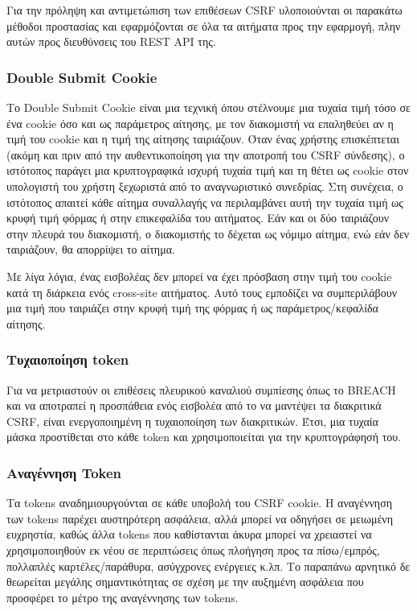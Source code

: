 Για την πρόληψη και αντιμετώπιση των επιθέσεων CSRF υλοποιούνται οι παρακάτω μέθοδοι προστασίας και εφαρμόζονται σε όλα τα αιτήματα προς την εφαρμογή, πλην αυτών προς διευθύνσεις του REST API της.

\subsubsection{Double Submit Cookie}
Το Double Submit Cookie είναι μια τεχνική όπου στέλνουμε μια τυχαία τιμή τόσο σε ένα cookie όσο και ως παράμετρος αίτησης, με τον διακομιστή να επαληθεύει αν η τιμή του cookie και η τιμή της αίτησης ταιριάζουν. Όταν ένας χρήστης επισκέπτεται (ακόμη και πριν από την αυθεντικοποίηση για την αποτροπή του CSRF σύνδεσης), ο ιστότοπος παράγει μια κρυπτογραφικά ισχυρή τυχαία τιμή και τη θέτει ως cookie στον υπολογιστή του χρήστη ξεχωριστά από το αναγνωριστικό συνεδρίας. Στη συνέχεια, ο ιστότοπος απαιτεί κάθε αίτημα συναλλαγής να περιλαμβάνει αυτή την τυχαία τιμή ως κρυφή τιμή φόρμας ή στην επικεφαλίδα του αιτήματος. Εάν και οι δύο ταιριάζουν στην πλευρά του διακομιστή, ο διακομιστής το δέχεται ως νόμιμο αίτημα, ενώ εάν δεν ταιριάζουν, θα απορρίψει το αίτημα.

Με λίγα λόγια, ένας εισβολέας δεν μπορεί να έχει πρόσβαση στην τιμή του cookie κατά τη διάρκεια ενός cross-site αιτήματος. Αυτό τους εμποδίζει να συμπεριλάβουν μια τιμή που ταιριάζει στην κρυφή τιμή της φόρμας ή ως παράμετρος/κεφαλίδα αίτησης.

\subsubsection{Τυχαιοποίηση token}
Για να μετριαστούν οι επιθέσεις πλευρικού καναλιού συμπίεσης όπως το BREACH και να αποτραπεί η προσπάθεια ενός εισβολέα από το να μαντέψει τα διακριτικά CSRF, είναι ενεργοποιημένη η τυχαιοποίηση των διακριτικών. Έτσι, μια τυχαία μάσκα προστίθεται στο κάθε token και χρησιμοποιείται για την κρυπτογράφησή του.

\subsubsection{Αναγέννηση Token}
Τα tokens αναδημιουργούνται σε κάθε υποβολή του CSRF cookie. Η αναγέννηση των tokens παρέχει αυστηρότερη ασφάλεια, αλλά μπορεί να οδηγήσει σε μειωμένη ευχρηστία, καθώς άλλα tokens που καθίστανται άκυρα μπορεί να χρειαστεί να χρησιμοποιηθούν εκ νέου σε περιπτώσεις όπως πλοήγηση προς τα πίσω/εμπρός, πολλαπλές καρτέλες/παράθυρα, ασύγχρονες ενέργειες κ.λπ. Το παραπάνω αρνητικό δε θεωρείται μεγάλης σημαντικότητας σε σχέση με την αυξημένη ασφάλεια που προσφέρει το μέτρο της αναγέννησης των tokens.


